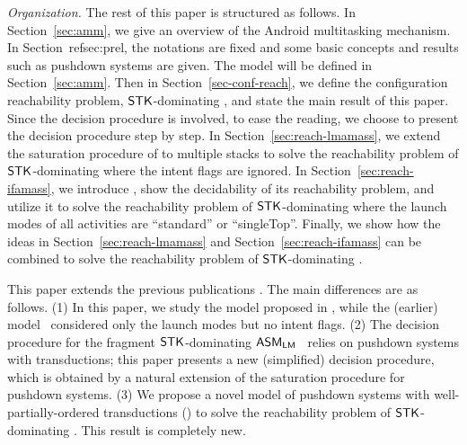 \smallskip	
\noindent\emph{Organization.} The rest of this paper is structured as follows. In Section~\ref{sec:amm}, we give an overview of the Android multitasking mechanism. In Section~ref{sec:prel}, the notations are fixed and some basic concepts and results such as pushdown systems are given. 
The {\AMASS} model will be defined in Section~\ref{sec:amm}. Then in Section~\ref{sec-conf-reach}, we define the configuration reachability problem, $\mathsf{STK}$-dominating {\AMASS}, and state the main result of this paper. Since the decision procedure is involved, to ease the reading, we choose to present the decision procedure step by step. In Section~\ref{sec:reach-lmamass}, we extend the saturation procedure of {\PDS} to multiple stacks to solve the reachability problem of $\mathsf{STK}$-dominating {\AMASS} where the intent flags are ignored. 
In Section~\ref{sec:reach-ifamass}, we introduce {\WOTrPDS}, show the decidability of its reachability problem, and utilize it to solve the reachability problem of $\mathsf{STK}$-dominating {\AMASS} where the launch modes of all activities are ``standard'' or ``singleTop''. Finally, we show how the ideas in Section~\ref{sec:reach-lmamass} and Section~\ref{sec:reach-ifamass} can be combined to solve the reachability problem of $\mathsf{STK}$-dominating {\AMASS}. 

This paper extends the previous publications \cite{CHS+18,HC+19}.  The main differences are %
as follows. (1) In this paper, we study the {\AMASS} model proposed in \cite{HC+19}, while the (earlier) model~\cite{CHS+18} considered only the launch modes but no intent flags. (2) The decision procedure for the fragment $\mathsf{STK}$-dominating $\textsf{ASM}_\textsf{LM}$~\cite{CHS+18} relies on pushdown systems with transductions; this paper presents a new (simplified) decision procedure, which is obtained by a natural extension of the saturation procedure for pushdown systems. %
(3) We propose a novel model of pushdown systems with well-partially-ordered transductions (\WOTrPDS) %
to solve the reachability problem of $\mathsf{STK}$-dominating {\AMASS}. This result is completely new.  

